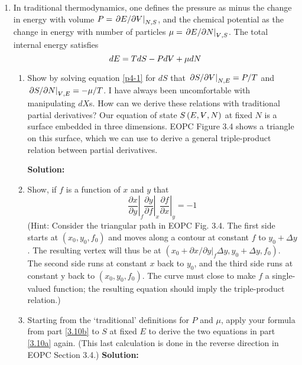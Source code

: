 \documentclass[10pt]{article}
\newenvironment{Solution}
    {\textbf{Solution:}
    
    \vspace{5mm}
    \begin{tcolorbox}
    }
    {
    \end{tcolorbox}
    \vspace{5mm}
    }
\newcommand{\vol}{{\ooalign{\hfil$V$\hfil\cr\kern0.08em--\hfil\cr}}}
\begin{document}
\begin{enumerate}
\item In traditional thermodynamics, one defines the pressure as minus the change in energy with volume $P = \left.{ \partial E /\partial\vol  }\right|_{N,S}$, and the chemical potential as the change in energy with number of particles $\mu = \left.\partial E/\partial N \right|_{\scriptsize{\vol}, S}$. The total internal energy satisfies
\begin{equation}\label{p4-1}
    dE = T d S - P d\vol +\mu dN
\end{equation}
\begin{enumerate}
    \item \label{3.10a} Show by solving equation \ref{p4-1} for $dS$ that $ \left.\partial S/\partial \vol \right|_{N, E} = P/T$ and $ \left.\partial S/\partial N \right|_{\scriptsize{\vol}, E} = -\mu/T$. I have always been uncomfortable with manipulating $dX$s. How can we derive these relations with traditional partial derivatives? Our equation of state $S\left(E, \vol, N \right)$ at fixed $N$ is a surface embedded in three dimensions. EOPC Figure 3.4 shows a triangle on this surface, which we can use to derive a general triple-product relation between partial derivatives.
    
    
    \begin{Solution}


    \end{Solution}
    
    \item \label{3.10b} Show, if $f$ is a function of $x$ and $y$ that 
    \begin{equation}
        \left.\frac{\partial x}{\partial y}\right|_f 
        \left.\frac{\partial y}{\partial f}\right|_x 
        \left.\frac{\partial f}{\partial x}\right|_y = -1
    \end{equation}
    (Hint:  Consider the triangular path in EOPC Fig. 3.4. The first side starts at $(x_0 , y_0 , f_0 )$ and moves along a contour at constant $f$ to $y_0+\Delta y$. The resulting vertex will thus be at $\left(x_0+\left. {\partial x/\partial y}\right|_f \Delta y, y_0+\Delta y, f_0\right)$. The second side runs at constant $x$ back to $y_0$, and the third side runs at constant y back to $(x_0 , y_0 , f_0 )$. The curve must close to make $f$ a single-valued function; the resulting equation should imply the triple-product relation.)
    \item Starting from the ‘traditional’ definitions for $P$ and $\mu$, apply your formula from part \ref{3.10b} to $S$ at fixed $E$ to derive the two equations in part \ref{3.10a} again. (This last calculation is done in the reverse direction in EOPC Section 3.4.)
    \begin{Solution}
    

\end{Solution}
\end{enumerate}
\end{enumerate}
\end{document}
